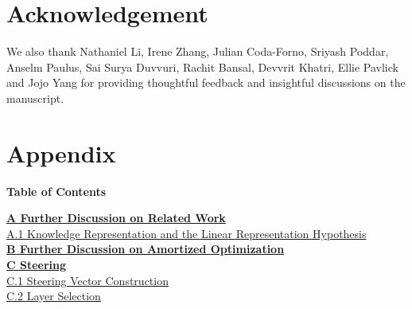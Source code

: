 \documentclass{article} %
\begin{document}
% 

\label{refs}
\nocite{*} %

\newpage



\section{Acknowledgement}
We also thank Nathaniel Li, Irene Zhang,  Julian Coda-Forno, Sriyash Poddar, Anselm Paulus, Sai Surya Duvvuri, Rachit Bansal, Devvrit Khatri, Ellie Pavlick and Jojo Yang for providing thoughtful feedback and insightful discussions on the manuscript.



\newpage
\appendix

\section*{Appendix}



\begin{center}
\textbf{\Large Table of Contents}
\end{center}

\vspace{1em}

\noindent \textbf{\hyperref[app:related_work]{A \quad Further Discussion on Related Work}} \dotfill \textbf{\pageref{app:related_work}} \\
\phantom{A}\quad \hyperref[app:linear_rep]{A.1 \quad Knowledge Representation and the Linear Representation Hypothesis} \dotfill \pageref{app:linear_rep} \\

\vspace{0.5em}
\noindent \textbf{\hyperref[app:amortized_optimization]{B \quad Further Discussion on Amortized Optimization}} \dotfill \textbf{\pageref{app:amortized_optimization}} \\

\vspace{0.5em}
\noindent \textbf{\hyperref[app:steering]{C \quad Steering}} \dotfill \textbf{\pageref{app:steering}} \\
\phantom{C}\quad \hyperref[app:steering_vector]{C.1 \quad Steering Vector Construction} \dotfill \pageref{app:steering_vector} \\
\phantom{C}\quad \hyperref[app:select_layer]{C.2 \quad Layer Selection} \dotfill \pageref{app:select_layer} \\
\end{document}
